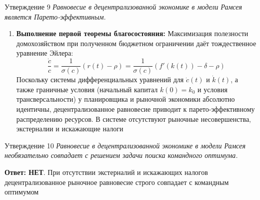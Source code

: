 \documentclass[10pt,a4paper]{article}
\newcommand{\qnet}{\textbf{\color{nored}Ответ: НЕТ}}
\newenvironment{answer}[2]{%
  \begin{qbox}{Утверждение #1}
  \textit{#2}\par\smallskip
}{%
  \end{qbox}\vspace{2pt}
}
\begin{document}
\begin{answer}{9}{Равновесие в децентрализованной экономике в модели Рамсея является Парето-эффективным.}
\begin{enumerate}
    \item \textbf{Выполнение первой теоремы благосостояния:}
    Максимизация полезности домохозяйством при полученном бюджетном ограничении даёт тождественное уравнение Эйлера:
    \[
    \frac{\dot{c}}{c} = \frac{1}{\sigma(c)} (r(t) - \rho) = \frac{1}{\sigma(c)} \left( f'(k(t)) - \delta - \rho \right)
    \]
    Поскольку системы дифференциальных уравнений для $\dot{c}(t)$ и $\dot{k}(t)$, а также граничные условия (начальный капитал $k(0) = k_0$ и условия трансверсальности) у планировщика и рыночной экономики абсолютно идентичны, децентрализованное равновесие приводит к парето-эффективному распределению ресурсов. В системе отсутствуют рыночные несовершенства, экстерналии и искажающие налоги
\end{enumerate}
\end{answer}

\begin{answer}{10}{Равновесие в децентрализованной экономике в модели Рамсея необязательно совпадает с решением задачи поиска командного оптимума.}
\qnet. При отсутствии экстерналий и искажающих налогов децентрализованное рыночное равновесие строго совпадает с командным оптимумом
\end{answer}
\end{document}
